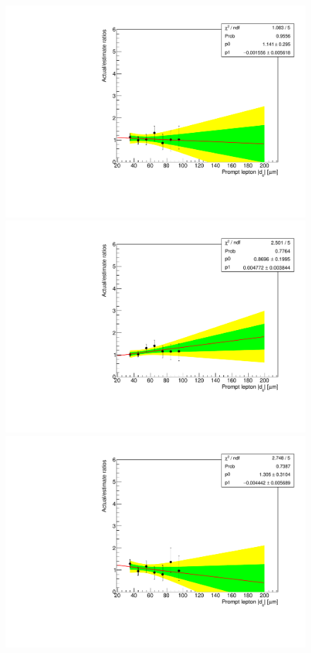 \begin{figure}[hbtp]
\centering
\includegraphics[scale=0.35]{figures/bg/ee_data_2016_displacedSubleading_ratiosVsPromptD0.pdf}
\includegraphics[scale=0.35]{figures/bg/ee_data_2017_2018_displacedSubleading_ratiosVsPromptD0.pdf}
\includegraphics[scale=0.35]{figures/bg/ee_data_2016_displacedLeading_ratiosVsPromptD0.pdf}

\end{figure}
